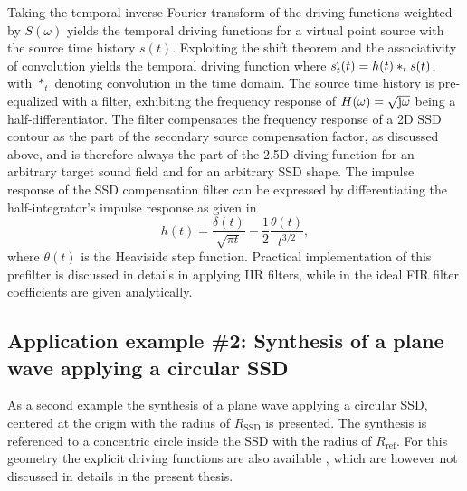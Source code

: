 Taking the temporal inverse Fourier transform of the driving functions weighted by $S(\omega)$ yields the temporal driving functions for a virtual point source with the source time history $s(t)$.
Exploiting the shift theorem and the associativity of convolution yields the temporal driving function
where $s^{\nshortmid}_t( t ) = h(t) \ast_t s( t  )$, with $\ast_t$ denoting convolution in the time domain.
The source time history is pre-equalized with a filter, exhibiting the frequency response of $H(\omega) = \sqrt{\mathrm{j} \omega}$ being a half-differentiator. 
The filter compensates the frequency response of a 2D SSD contour as the part of the secondary source compensation factor, as discussed above, and is therefore always the part of the 2.5D diving function for an arbitrary target sound field and for an arbitrary SSD shape.
The impulse response of the SSD compensation filter can be expressed by differentiating the half-integrator's impulse response as given in \cite{Deregowski1983}
\begin{equation}
h(t) = \frac{\delta(t)}{\sqrt{\pi t}} - \frac{1}{2} \frac{\theta(t)}{t^{3/2}},
\end{equation}
where $\theta(t)$ is the Heaviside step function.
Practical implementation of this prefilter is discussed in details in \cite{Schultz2013:IIR_prefilters} applying IIR filters, while in \cite[Sec. 2.5]{Schultz2016} the ideal FIR filter coefficients are given analytically.

\subsection*{Application example \#2: Synthesis of a plane wave applying a circular SSD}

As a second example the synthesis of a plane wave applying a circular SSD, centered at the origin with the radius of $R_{\mathrm{SSD}}$ is presented.
The synthesis is referenced to a concentric circle inside the SSD with the radius of $R_{\mathrm{ref}}$.
For this geometry the explicit driving functions are also available \cite{Ahrens2008:Analytical_Circ_Spherical_SFS, Ahrens2009:circularSSD_mismatch, Ahrens2009:circular25D_SFR}, which are however not discussed in details in the present thesis.

